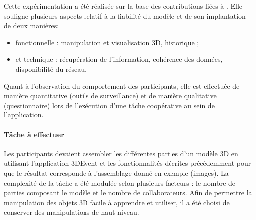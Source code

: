  Cette expérimentation a été réalisée sur la base des contributions liées à 
\cite{Desprat2016,Desprat2017}. Elle souligne plusieurs aspects relatif à la fiabilité 
du modèle et de son implantation de deux manières: 
\begin{itemize}
	\item fonctionnelle : manipulation et visualisation 
	3D, historique ;
	\item et technique : récupération de l'information, cohérence des 
	données, disponibilité du réseau.
\end{itemize}

Quant à l'observation du comportement des participants, elle est 
effectuée de manière quantitative (outils de surveillance) et de manière qualitative 
(questionnaire) lors de l'exécution d'une tâche coopérative au sein de l'application.

\paragraph{Tâche à effectuer}
Les participants devaient assembler les différentes parties d'un modèle 3D en 
utilisant l'application 3DEvent et les fonctionnalités décrites précédemment 
 pour que le résultat corresponde à l'assemblage 
donné en exemple (images). La complexité de la tâche a été modulée selon 
plusieurs facteurs : le nombre de parties composant le modèle et le nombre de 
collaborateurs. Afin de permettre la manipulation des objets 3D facile à 
apprendre et utiliser, il a été choisi de conserver des manipulations de haut niveau.
